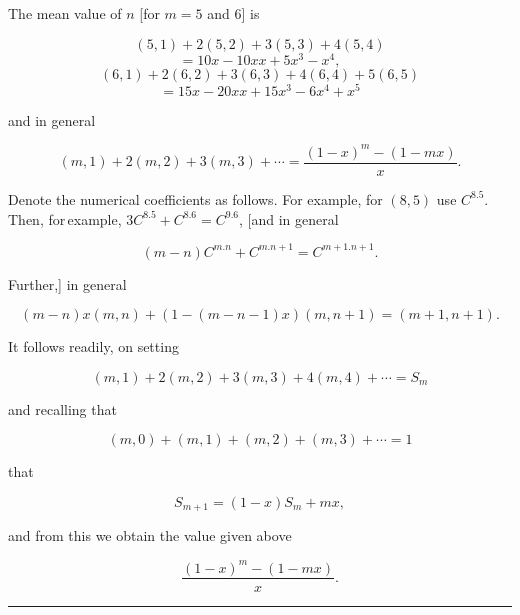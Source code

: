 \clearpage
{}
The mean value of $n$ [for $m=5$ and $6$] is

\[
(5,1)+2(5,2)+3(5,3)+4(5,4)
\]
\[
= 10x-10xx+5x^3-x^4,
\]
\[
(6,1)+2(6,2)+3(6,3)+4(6,4)+5(6,5)
\]
\[
= 15x-20xx+15x^3-6x^4+x^5
\]

and in general

\[
(m,1)+2(m,2)+3(m,3)+\cdots = \frac{(1-x)^m-(1-mx)}{x}.
\]

Denote the numerical coefficients as follows. For example, for $(8,5)$ use
$C^{8.5}$. Then, for\,example, $3C^{8.5}+C^{8.6}=C^{9.6}$,
[and in general

\[
(m-n)C^{m.n}+C^{m.n+1}=C^{m+1.n+1}.
\]

Further,] in general

\[
(m-n)x(m,n)+(1-(m-n-1)x)(m,n+1)=(m+1,n+1).
\]

It follows readily, on setting

\[
(m,1)+2(m,2)+3(m,3)+4(m,4)+\cdots = S_m
\]

and recalling that

\[
(m,0)+(m,1)+(m,2)+(m,3)+\cdots = 1
\]

that

\[
S_{m+1} = (1-x)S_m+mx,
\]

and from this we obtain the value given above

\[
\frac{(1-x)^m-(1-mx)}{x}.
\]

\bigskip
\hrule
